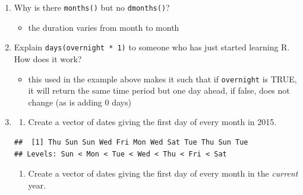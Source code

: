 \documentclass[]{book}
\newenvironment{Shaded}{\begin{snugshade}}{\end{snugshade}}
\newcommand{\DataTypeTok}[1]{\textcolor[rgb]{0.13,0.29,0.53}{#1}}
\newcommand{\DecValTok}[1]{\textcolor[rgb]{0.00,0.00,0.81}{#1}}
\newcommand{\KeywordTok}[1]{\textcolor[rgb]{0.13,0.29,0.53}{\textbf{#1}}}
\newcommand{\NormalTok}[1]{#1}
\newcommand{\OperatorTok}[1]{\textcolor[rgb]{0.81,0.36,0.00}{\textbf{#1}}}
\newcommand{\OtherTok}[1]{\textcolor[rgb]{0.56,0.35,0.01}{#1}}
\newcommand{\StringTok}[1]{\textcolor[rgb]{0.31,0.60,0.02}{#1}}
\providecommand{\tightlist}{%
  \setlength{\itemsep}{0pt}\setlength{\parskip}{0pt}}
\theoremstyle{definition}
\theoremstyle{definition}
\theoremstyle{definition}
\theoremstyle{remark}
\begin{document}
\begin{enumerate}
\def\labelenumi{\arabic{enumi}.}
\item
  Why is there \texttt{months()} but no \texttt{dmonths()}?

  \begin{itemize}
  \tightlist
  \item
    the duration varies from month to month
  \end{itemize}
\item
  Explain \texttt{days(overnight\ *\ 1)} to someone who has just started
  learning R. How does it work?

  \begin{itemize}
  \tightlist
  \item
    this used in the example above makes it such that if
    \texttt{overnight} is TRUE, it will return the same time period but
    one day ahead, if false, does not change (as is adding 0 days)
  \end{itemize}
\item
  \begin{enumerate}
  \def\labelenumii{\alph{enumii}.}
  \tightlist
  \item
    Create a vector of dates giving the first day of every month in
    2015.
  \end{enumerate}

\begin{Shaded}
\end{Shaded}

\begin{verbatim}
##  [1] Thu Sun Sun Wed Fri Mon Wed Sat Tue Thu Sun Tue
## Levels: Sun < Mon < Tue < Wed < Thu < Fri < Sat
\end{verbatim}

  \begin{enumerate}
  \def\labelenumii{\alph{enumii}.}
  \setcounter{enumii}{1}
  \tightlist
  \item
    Create a vector of dates giving the first day of every month in the
    \emph{current} year.
  \end{enumerate}


\end{enumerate}
\end{document}
